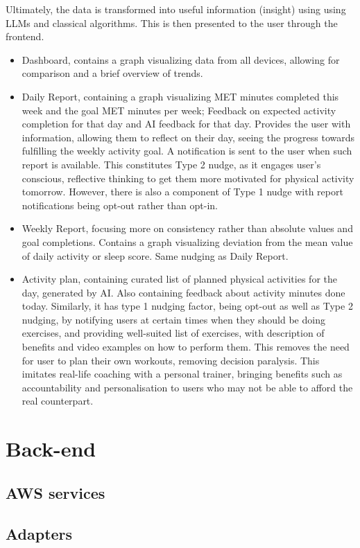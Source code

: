 Ultimately, the data is transformed into useful information (insight) using using LLMs and classical algorithms. This is then presented to the user through the frontend. 
\begin{itemize}
    \item {Dashboard, contains a graph visualizing data from all devices, allowing for comparison and a brief overview of trends.}
    \item {Daily Report, containing a graph visualizing MET minutes completed this week and the goal MET minutes per week; Feedback on expected activity completion for that day and AI feedback for that day. Provides the user with information, allowing them to reflect on their day, seeing the progress towards fulfilling the weekly activity goal. A notification is sent to the user when such report is available. This constitutes Type 2 nudge, as it  engages user's conscious, reflective thinking to get them more motivated for physical activity tomorrow. However, there is also a component of Type 1 nudge with report notifications being opt-out rather than opt-in.}
    \item {Weekly Report, focusing more on consistency rather than absolute values and goal completions. Contains a graph visualizing deviation from the mean value of daily activity or sleep score. Same nudging as Daily Report.}
    \item {Activity plan, containing curated list of planned physical activities for the day, generated by AI. Also containing feedback about activity minutes done today. Similarly, it has type 1 nudging factor, being opt-out as well as Type 2 nudging, by notifying users at certain times when they should be doing exercises, and providing well-suited list of exercises, with description of benefits and video examples on how to perform them. This removes the need for user to plan their own workouts, removing decision paralysis. This imitates real-life coaching with a personal trainer, bringing benefits such as accountability and personalisation to users who may not be able to afford the real counterpart.}
\end{itemize}

\section{Back-end}
\subsection{AWS services}
\subsection{Adapters}
